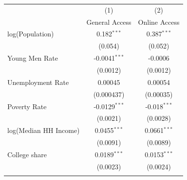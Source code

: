 \begin{tabular}{@{\extracolsep{5pt}} lcc} 
\toprule
\midrule
 & (1) & (2) \\
   & General Access  & Online Access  \\ 
\midrule

\enspace log(Population) & 0.182$^{***}$ & 0.387$^{***}$  \\ 
 & (0.054) & (0.052) \\ 
 \addlinespace
\enspace  Young Men Rate & -0.0041$^{***}$ & -0.0006 \\ 
  & (0.0012) & (0.0012) \\ 
 \addlinespace  
 \enspace  Unemployment Rate & 0.00045 & 0.00054 \\ 
 & (0.000437) & (0.00035) \\ 
 \addlinespace
\enspace Poverty Rate & -0.0129$^{***}$ & -0.018$^{***}$ \\ 
 & (0.0021) & (0.0028) \\ 
 \addlinespace
 \enspace log(Median HH Income) & 0.0455$^{***}$ & 0.0661$^{***}$ \\ 
  & (0.0091) & (0.0089) \\ 
 \addlinespace
 \enspace College share & 0.0189$^{***}$ & 0.0153$^{***}$ \\ 
  & (0.0023) & (0.0024) \\ 
 \addlinespace
 
\bottomrule 
\end{tabular} 